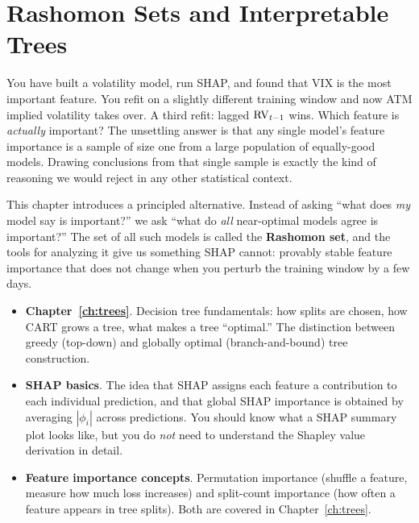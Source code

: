 
\chapter{Rashomon Sets and Interpretable Trees}\label{ch:rashomon}

You have built a volatility model, run SHAP, and found that VIX is the most
important feature.  You refit on a slightly different training window and now
ATM implied volatility takes over.  A third refit: lagged $\operatorname{RV}_{t-1}$ wins.
Which feature is \emph{actually} important?  The unsettling answer is that any
single model's feature importance is a sample of size one from a large
population of equally-good models.  Drawing conclusions from that single
sample is exactly the kind of reasoning we would reject in any other
statistical context.

This chapter introduces a principled alternative.  Instead of asking ``what
does \emph{my} model say is important?'' we ask ``what do \emph{all}
near-optimal models agree is important?''  The set of all such models is
called the \textbf{Rashomon set}, and the tools for analyzing it give us
something SHAP cannot: provably stable feature importance that does not
change when you perturb the training window by a few days.

\begin{prereq}
\begin{itemize}[leftmargin=1.8em]
  \item \textbf{Chapter~\ref{ch:trees}}.  Decision tree fundamentals: how
    splits are chosen, how CART grows a tree, what makes a tree
    ``optimal.''  The distinction between greedy (top-down) and globally
    optimal (branch-and-bound) tree construction.
  \item \textbf{SHAP basics}.  The idea that SHAP assigns each feature a
    contribution to each individual prediction, and that global SHAP
    importance is obtained by averaging $|\phi_i|$ across predictions.
    You should know what a SHAP summary plot looks like, but you do
    \emph{not} need to understand the Shapley value derivation in detail.
  \item \textbf{Feature importance concepts}.  Permutation importance
    (shuffle a feature, measure how much loss increases) and split-count
    importance (how often a feature appears in tree splits).  Both are
    covered in Chapter~\ref{ch:trees}.
\end{itemize}
\end{prereq}


